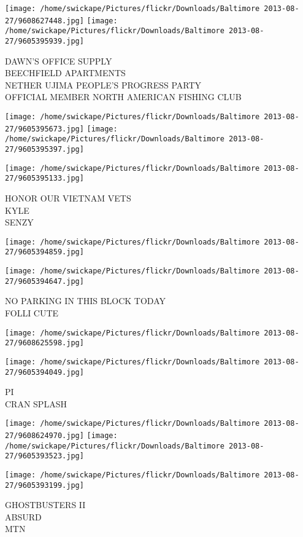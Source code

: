 \documentclass[10pt,letterpaper]{article}
\begin{document}
\texttt{[image: /home/swickape/Pictures/flickr/Downloads/Baltimore 2013-08-27/9608627448.jpg]}
\texttt{[image: /home/swickape/Pictures/flickr/Downloads/Baltimore 2013-08-27/9605395939.jpg]}

DAWN'S OFFICE SUPPLY\\
BEECHFIELD APARTMENTS\\
NETHER UJIMA PEOPLE'S PROGRESS PARTY\\
OFFICIAL MEMBER NORTH AMERICAN FISHING CLUB
\pagebreak

\texttt{[image: /home/swickape/Pictures/flickr/Downloads/Baltimore 2013-08-27/9605395673.jpg]}
\texttt{[image: /home/swickape/Pictures/flickr/Downloads/Baltimore 2013-08-27/9605395397.jpg]}

\vspace{0.25in}
\texttt{[image: /home/swickape/Pictures/flickr/Downloads/Baltimore 2013-08-27/9605395133.jpg]}

HONOR OUR VIETNAM VETS\\
KYLE\\
SENZY
\pagebreak

\texttt{[image: /home/swickape/Pictures/flickr/Downloads/Baltimore 2013-08-27/9605394859.jpg]}

\vspace{0.25in}
\texttt{[image: /home/swickape/Pictures/flickr/Downloads/Baltimore 2013-08-27/9605394647.jpg]}

NO PARKING IN THIS BLOCK TODAY\\
FOLLI CUTE
\pagebreak

\texttt{[image: /home/swickape/Pictures/flickr/Downloads/Baltimore 2013-08-27/9608625598.jpg]}

\vspace{0.25in}
\texttt{[image: /home/swickape/Pictures/flickr/Downloads/Baltimore 2013-08-27/9605394049.jpg]}

PI\\
CRAN SPLASH
\pagebreak

\texttt{[image: /home/swickape/Pictures/flickr/Downloads/Baltimore 2013-08-27/9608624970.jpg]}
\texttt{[image: /home/swickape/Pictures/flickr/Downloads/Baltimore 2013-08-27/9605393523.jpg]}

\texttt{[image: /home/swickape/Pictures/flickr/Downloads/Baltimore 2013-08-27/9605393199.jpg]}

GHOSTBUSTERS II\\
ABSURD\\
MTN
\pagebreak
\end{document}
